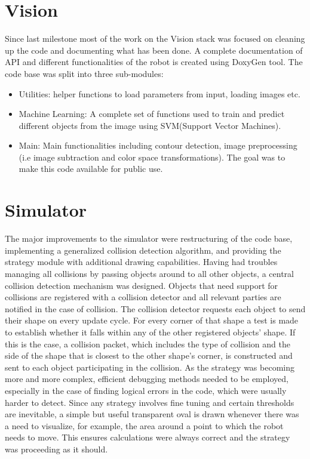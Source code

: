 \documentclass[conference,12pt]{IEEEtran}
\begin{document}
\section{Vision}
Since last milestone most of the work on the Vision stack was focused on cleaning up the code and documenting what has been done. A complete documentation of API and different functionalities of the robot is created using DoxyGen\cite{web:DoxyGen} tool.
The code base was split into three sub-modules:
\begin{itemize}
\item Utilities: helper functions to load parameters from input, loading images etc.
\item Machine Learning: A complete set of functions used to train and predict different objects from the image using SVM(Support Vector Machines).
\item Main: Main functionalities including contour detection, image preprocessing (i.e image subtraction and color space transformations).
The goal was to make this code available for public use.
\end{itemize}
 
\section{Simulator}
The major improvements to the simulator were restructuring of the code base, implementing a generalized collision detection algorithm, and providing the strategy module with additional drawing capabilities.
Having had troubles managing all collisions by passing objects around to all other objects, a central collision detection mechanism was designed. Objects that need support for collisions are registered with a collision detector and all relevant parties are notified in the case of collision. The collision detector requests each object to send their shape on every update cycle. For every corner of that shape a test is made to establish whether it falls within any of the other registered objects' shape. If this is the case, a collision packet, which includes the type of collision and the side of the shape that is closest to the other shape's corner, is constructed and sent to each object participating in the collision. 
As the strategy was becoming more and more complex, efficient debugging methods needed to be employed, especially in the case of finding logical errors in the code, which were usually harder to detect. Since any strategy involves fine tuning and certain thresholds are inevitable, a simple but useful transparent oval is drawn whenever there was a need to visualize, for example, the area around a point to which the robot needs to move. This ensures calculations were always correct and the strategy was proceeding as it should.
\end{document}

